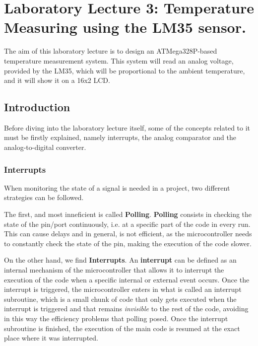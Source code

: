\section{Laboratory Lecture 3: Temperature Measuring using the LM35 sensor.}

The aim of this laboratory lecture is to design an ATMega328P-based temperature measurement system. This system will read an analog voltage, provided by the LM35, which will be proportional to the ambient temperature, and it will show it on a 16x2 LCD. \medskip

\subsection{Introduction}

Before diving into the laboratory lecture itself, some of the concepts related to it must be firstly explained, namely interrupts, the analog comparator and the analog-to-digital converter.

\subsubsection{Interrupts}

When monitoring the state of a signal is needed in a project, two different strategies can be followed.\medskip

The first, and most inneficient is called \textbf{Polling}. \textbf{Polling} consists in checking the state of the pin/port continuously, i.e. at a specific part of the code in every run. This can cause delays and in general, is not efficient, as the microcontroller needs to constantly check the state of the pin, making the execution of the code slower.\medskip

On the other hand, we find \textbf{Interrupts}. An \textbf{interrupt} can be defined as an internal mechanism of the microcontroller that allows it to interrupt the execution of the code when a specific internal or external event occurs. Once the interrupt is triggered, the microcontroller enters in what is called an interrupt subroutine, which is a small chunk of code that only gets executed when the interrupt is triggered and that remains \textit{invisible} to the rest of the code, avoiding in this way the efficiency problems that polling posed. Once the interrupt subroutine is finished, the execution of the main code is resumed at the exact place where it was interrupted. \medskip

\clearpage


